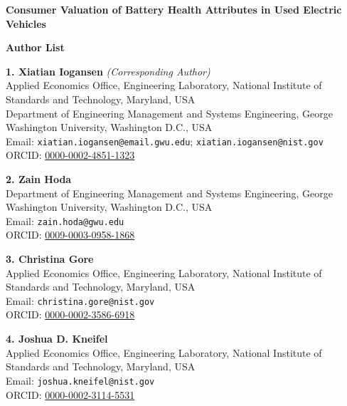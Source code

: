 \documentclass[a4paper,12pt]{article}
\begin{document}
\begin{center}
{\Large\bfseries Consumer Valuation of Battery Health Attributes in Used Electric Vehicles}
\end{center}

\vspace{2em}

{\LARGE\bfseries Author List}

\vspace{1em}

\noindent\textbf{1. Xiatian Iogansen} \textit{(Corresponding Author)}\\
Applied Economics Office, Engineering Laboratory, National Institute of Standards and Technology, Maryland, USA\\
Department of Engineering Management and Systems Engineering, George Washington University, Washington D.C., USA\\
Email: \texttt{xiatian.iogansen@email.gwu.edu}; \texttt{xiatian.iogansen@nist.gov}\\
ORCID: \href{https://orcid.org/0000-0002-4851-1323}{0000-0002-4851-1323}

\vspace{1em}

\noindent\textbf{2. Zain Hoda}\\
Department of Engineering Management and Systems Engineering, George Washington University, Washington D.C., USA\\
Email: \texttt{zain.hoda@gwu.edu}\\
ORCID: \href{https://orcid.org/0009-0003-0958-1868}{0009-0003-0958-1868}

\vspace{1em}

\noindent\textbf{3. Christina Gore}\\
Applied Economics Office, Engineering Laboratory, National Institute of Standards and Technology, Maryland, USA\\
Email: \texttt{christina.gore@nist.gov}\\
ORCID: \href{https://orcid.org/0000-0002-3586-6918}{0000-0002-3586-6918}

\vspace{1em}

\noindent\textbf{4. Joshua D. Kneifel}\\
Applied Economics Office, Engineering Laboratory, National Institute of Standards and Technology, Maryland, USA\\
Email: \texttt{joshua.kneifel@nist.gov}\\
ORCID: \href{https://orcid.org/0000-0002-3114-5531}{0000-0002-3114-5531}
\end{document}
